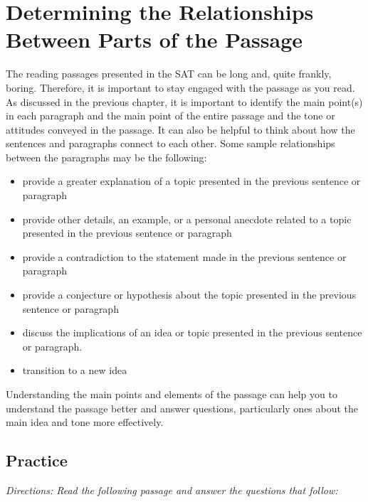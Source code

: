 \section{Determining the Relationships Between Parts of the Passage}

The reading passages presented in the SAT can be long and, quite frankly, boring. Therefore, it is important to stay engaged with the passage as you read. As discussed in the previous chapter, it is important to identify the main point(s) in each paragraph and the main point of the entire passage and the tone or attitudes conveyed in the passage. It can also be helpful to think about how the sentences and paragraphs connect to each other. Some sample relationships between the paragraphs may be the following:

\bigskip
\begin{itemize}
\item provide a greater explanation of a topic presented in the previous sentence or paragraph 

\bigskip
\item provide other details, an example, or a personal anecdote related to a topic presented in the previous sentence or paragraph

\bigskip
\item provide a contradiction to the statement made in the previous sentence or paragraph

\bigskip
\item provide a conjecture or hypothesis about the topic presented in the previous sentence or paragraph

\bigskip
\item discuss the implications of an idea or topic presented in the previous sentence or paragraph. 

\bigskip
\item transition to a new idea

\end{itemize}

Understanding the main points and elements of the passage can help you to understand the passage better and answer questions, particularly ones about the main idea and tone more effectively. 

\subsection{Practice}

\bigskip
\textit{Directions: Read the following passage and answer the questions that follow:}

